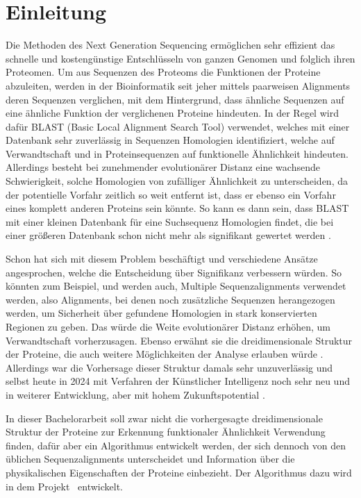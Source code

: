 \section{Einleitung} %
    \label{sec:einleitung}
    Die Methoden des Next Generation Sequencing ermöglichen sehr effizient das schnelle und kostengünstige Entschlüsseln von ganzen Genomen und folglich ihren Proteomen. Um aus Sequenzen des Proteoms die Funktionen der Proteine abzuleiten, werden in der Bioinformatik seit jeher mittels paarweisen Alignments deren Sequenzen verglichen, mit dem Hintergrund, dass ähnliche Sequenzen auf eine ähnliche Funktion der verglichenen Proteine hindeuten. In der Regel wird dafür BLAST (Basic Local Alignment Search Tool) verwendet, welches mit einer Datenbank sehr zuverlässig in Sequenzen Homologien identifiziert, welche auf Verwandtschaft und in Proteinsequenzen auf funktionelle Ähnlichkeit hindeuten. Allerdings besteht bei zunehmender evolutionärer Distanz eine wachsende Schwierigkeit, solche Homologien von zufälliger Ähnlichkeit zu unterscheiden, da der potentielle Vorfahr zeitlich so weit entfernt ist, dass er ebenso ein Vorfahr eines komplett anderen Proteins sein könnte. So kann es dann sein, dass BLAST mit einer kleinen Datenbank für eine Suchsequenz Homologien findet, die bei einer größeren Datenbank schon nicht mehr als signifikant gewertet werden .

    Schon  hat \citeauthor{similarity} sich mit diesem Problem beschäftigt und verschiedene Ansätze angesprochen, welche die Entscheidung über Signifikanz verbessern würden. So könnten zum Beispiel, und werden auch, Multiple Sequenzalignments verwendet werden, also Alignments, bei denen noch zusätzliche Sequenzen herangezogen werden, um Sicherheit über gefundene Homologien in stark konservierten Regionen zu geben. Das würde die Weite evolutionärer Distanz erhöhen, um Verwandtschaft vorherzusagen. Ebenso erwähnt sie die dreidimensionale Struktur der Proteine, die auch weitere Möglichkeiten der Analyse erlauben würde \autocite{similarity}. Allerdings war die Vorhersage dieser Struktur damals sehr unzuverlässig und selbst heute in 2024 mit Verfahren der Künstlicher Intelligenz noch sehr neu und in weiterer Entwicklung, aber mit hohem Zukunftspotential \autocite{alphafold1}\autocite{alphafold}.

    In dieser Bachelorarbeit soll zwar nicht die vorhergesagte dreidimensionale Struktur der Proteine zur Erkennung funktionaler Ähnlichkeit Verwendung finden, dafür aber ein Algorithmus entwickelt werden, der sich dennoch von den üblichen Sequenzalignments unterscheidet und Information über die physikalischen Eigenschaften der Proteine einbezieht. Der Algorithmus dazu wird in dem Projekt \protfin\ entwickelt.

